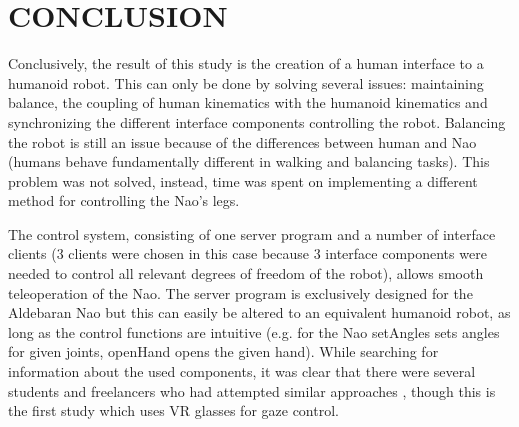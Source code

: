 \documentclass[letterpaper, 10pt, conference]{ieeeconf}
\begin{document}
\section{CONCLUSION}
Conclusively, the result of this study is the creation of a human interface to a humanoid robot. This can only be done by solving several issues: maintaining balance, the coupling of human kinematics with the humanoid kinematics and synchronizing the different interface components controlling the robot. Balancing the robot is still an issue because of the differences between human and Nao (humans behave fundamentally different in walking and balancing tasks). This problem was not solved, instead, time was spent on implementing a different method for controlling the Nao's legs.

The control system, consisting of one server program and a number of interface clients (3 clients were chosen in this case because 3 interface components were needed to control all relevant degrees of freedom of the robot), allows smooth teleoperation of the Nao. The server program is exclusively designed for the Aldebaran Nao but this can easily be altered to an equivalent humanoid robot, as long as the control functions are intuitive (e.g. for the Nao setAngles sets angles for given joints, openHand opens the given hand).
While searching for information about the used components, it was clear that there were several students and freelancers who had attempted similar approaches \cite{freiburg} \cite{veltrop}, though this is the first study which uses VR glasses for gaze control.


\end{document}
